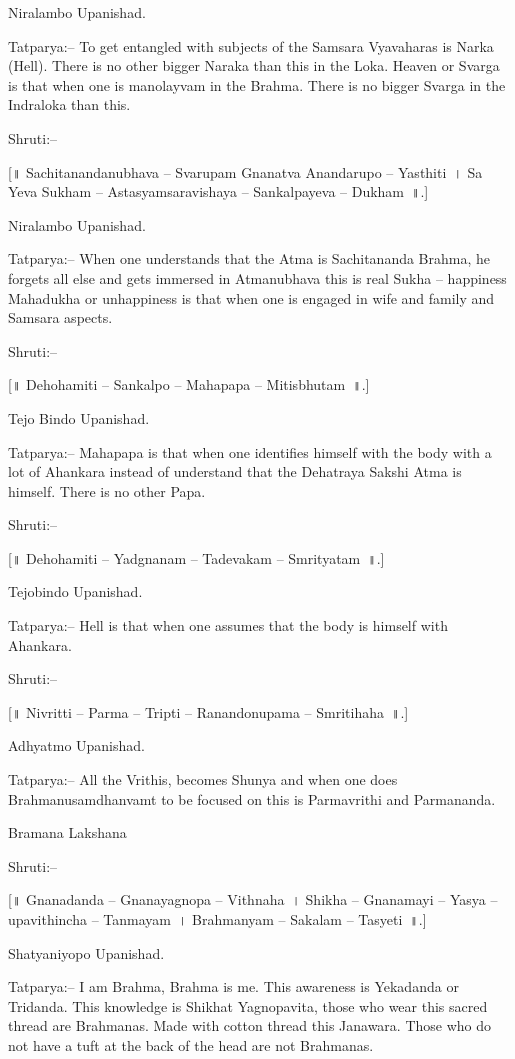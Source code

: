 Niralambo Upanishad.

Tatparya:– To get entangled with subjects of the Samsara Vyavaharas is Narka (Hell). There is no other bigger Naraka than this in the Loka. Heaven or Svarga is that when one is manolayvam in the Brahma. There is no bigger Svarga in the Indraloka than this.

Shruti:–

[॥ Sachitanandanubhava – Svarupam Gnanatva Anandarupo – Yasthiti~। Sa Yeva Sukham – Astasyamsaravishaya – Sankalpayeva – Dukham~॥.]

Niralambo Upanishad.

Tatparya:– When one understands that the Atma is Sachitananda Brahma, he forgets all else and gets immersed in Atmanubhava this is real Sukha – happiness Mahadukha or unhappiness is that when one is engaged in wife and family and Samsara aspects.

Shruti:–

[॥ Dehohamiti – Sankalpo – Mahapapa – Mitisbhutam~॥.]

Tejo Bindo Upanishad.

Tatparya:– Mahapapa is that when one identifies himself with the body with a lot of Ahankara instead of understand that the Dehatraya Sakshi Atma is himself. There is no other Papa.

Shruti:–

[॥ Dehohamiti – Yadgnanam – Tadevakam – Smrityatam~॥.]

Tejobindo Upanishad.

Tatparya:– Hell is that when one assumes that the body is himself with Ahankara.

Shruti:–

[॥ Nivritti – Parma – Tripti – Ranandonupama – Smritihaha~॥.]

Adhyatmo Upanishad.

Tatparya:– All the Vrithis, becomes Shunya and when one does Brahmanusamdhanvamt to be focused on this is Parmavrithi and Parmananda.

Bramana Lakshana

Shruti:–

[॥ Gnanadanda – Gnanayagnopa – Vithnaha~। Shikha – Gnanamayi – Yasya – upavithincha – Tanmayam~। Brahmanyam – Sakalam – Tasyeti~॥.]

Shatyaniyopo Upanishad.

Tatparya:– I am Brahma, Brahma is me. This awareness is Yekadanda or Tridanda. This knowledge is Shikhat Yagnopavita, those who wear this sacred thread are Brahmanas. Made with cotton thread this Janawara. Those who do not have a tuft at the back of the head are not Brahmanas.

